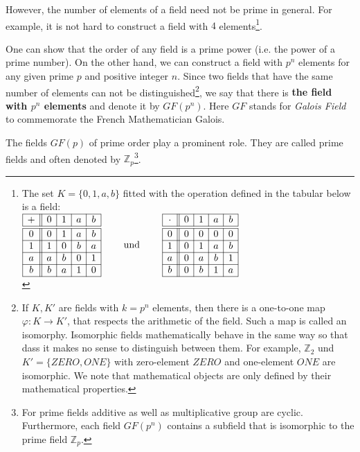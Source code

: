 However, the number of elements of a field need not be prime in general. For example, it is not hard to construct a field with $4$ elements\footnote{%
The set $K=\{0,1,a,b\}$ fitted with the operation defined in the tabular below is a field:\\
$
\begin{array}{|c||c|c|c|c|} 
\hline 
+ & 0 & 1 & a & b \\
\hline \hline
0 & 0 & 1 & a & b \\
\hline 
1 & 1 & 0 & b & a \\
\hline 
a & a & b & 0 & 1 \\
\hline 
b & b & a & 1 & 0 \\
\hline 
\end{array} \qquad {\rm ~und~} \qquad
\begin{array}{|c||c|c|c|c|} 
\hline 
\cdot & 0 & 1 & a & b  \\
\hline \hline
0 & 0 & 0 & 0 & 0 \\ 
\hline 
1 & 0 & 1 & a & b \\ 
\hline 
a & 0 & a & b & 1 \\ 
\hline 
b & 0 & b & 1 & a \\
\hline 
\end{array} 
$  \\
}.

One can show that the order of any field is a prime power (i.e. the power of a prime number). On the other hand, we can construct a field with $p^n$ elements for any given prime $p$ and positive integer $n$. Since two fields that have the same number of elements can not be distinguished\footnote{If $K,K'$ are fields with $k=p^n$ elements, then there is a one-to-one map $\varphi:K\to K'$, that respects the arithmetic of the field. Such a map is called an isomorphy. Isomorphic fields mathematically behave in the same way so that dass it makes no sense to distinguish between them. For example, ${\mathbb Z}_2$ und $K'=\{ ZERO,ONE\}$ with zero-element $ZERO$ and one-element $ONE$ are isomorphic. We note that mathematical objects are only defined by their mathematical properties.}, we say that there is {\bf the field with $p^n$ elements} and denote it by $GF(p^n)$. Here $GF$ stands for {\it Galois Field} to commemorate the French Mathematician Galois.

The fields $GF(p)$ of prime order play a prominent role. They are called prime fields and often denoted by ${\mathbb Z}_p$\footnote{For prime fields additive as well as multiplicative group are cyclic. Furthermore, each field $GF(p^n)$ contains a subfield that is isomorphic to the prime field ${\mathbb Z}_p$.}.



